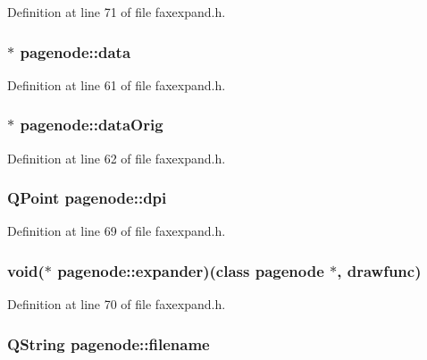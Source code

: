 Definition at line 71 of file faxexpand.\+h.

\hypertarget{classpagenode_af5c9ccfd1af1ac996caeb2518cbc739d}{
\subsubsection[{data}]{$\ast$ pagenode\+::data}}\label{classpagenode_af5c9ccfd1af1ac996caeb2518cbc739d}


Definition at line 61 of file faxexpand.\+h.

\hypertarget{classpagenode_a9f39d34f728116ceb5b9b4935c905aa1}{
\subsubsection[{data\+Orig}]{$\ast$ pagenode\+::data\+Orig}}\label{classpagenode_a9f39d34f728116ceb5b9b4935c905aa1}


Definition at line 62 of file faxexpand.\+h.

\hypertarget{classpagenode_a9d18577d1e468f4585554fa5b767e000}{
\subsubsection[{dpi}]{\setlength{\rightskip}{0pt plus 5cm}Q\+Point pagenode\+::dpi}}\label{classpagenode_a9d18577d1e468f4585554fa5b767e000}


Definition at line 69 of file faxexpand.\+h.

\hypertarget{classpagenode_a5e63779f24772ae97401d828bc75c099}{
\subsubsection[{expander}]{\setlength{\rightskip}{0pt plus 5cm}void($\ast$ pagenode\+::expander)(class {\bf pagenode} $\ast$, {\bf drawfunc})}}\label{classpagenode_a5e63779f24772ae97401d828bc75c099}


Definition at line 70 of file faxexpand.\+h.

\hypertarget{classpagenode_a0e79881e9e13c6f357162067036344f0}{
\subsubsection[{filename}]{\setlength{\rightskip}{0pt plus 5cm}Q\+String pagenode\+::filename}}\label{classpagenode_a0e79881e9e13c6f357162067036344f0}


